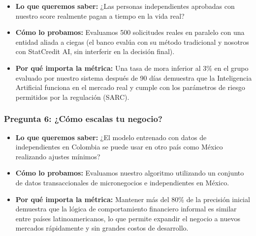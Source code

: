 \documentclass[11pt,a4paper]{article}
\begin{document}
\begin{tcolorbox}[colback=lightgray,colframe=secondary,title=\textbf{Experimento 5.2: Prueba piloto a ciegas con entidad financiera}]
\begin{itemize}[leftmargin=*]
    \item \textbf{Lo que queremos saber:} ¿Las personas independientes aprobadas con nuestro score realmente pagan a tiempo en la vida real?
    \item \textbf{Cómo lo probamos:} Evaluamos 500 solicitudes reales en paralelo con una entidad aliada a ciegas (el banco evalúa con su método tradicional y nosotros con StatCredit AI, sin interferir en la decisión final).
    \item \textbf{Por qué importa la métrica:} Una tasa de mora inferior al 3\% en el grupo evaluado por nuestro sistema después de 90 días demuestra que la Inteligencia Artificial funciona en el mercado real y cumple con los parámetros de riesgo permitidos por la regulación (SARC).
\end{itemize}
\end{tcolorbox}

\subsubsection{Pregunta 6: ¿Cómo escalas tu negocio?}

\begin{tcolorbox}[colback=lightgray,colframe=secondary,title=\textbf{Experimento 6.1: Prueba de adaptación del algoritmo a otro país (México)}]
\begin{itemize}[leftmargin=*]
    \item \textbf{Lo que queremos saber:} ¿El modelo entrenado con datos de independientes en Colombia se puede usar en otro país como México realizando ajustes mínimos?
    \item \textbf{Cómo lo probamos:} Evaluamos nuestro algoritmo utilizando un conjunto de datos transaccionales de micronegocios e independientes en México.
    \item \textbf{Por qué importa la métrica:} Mantener más del 80\% de la precisión inicial demuestra que la lógica de comportamiento financiero informal es similar entre países latinoamericanos, lo que permite expandir el negocio a nuevos mercados rápidamente y sin grandes costos de desarrollo.
\end{itemize}
\end{tcolorbox}
\end{document}
